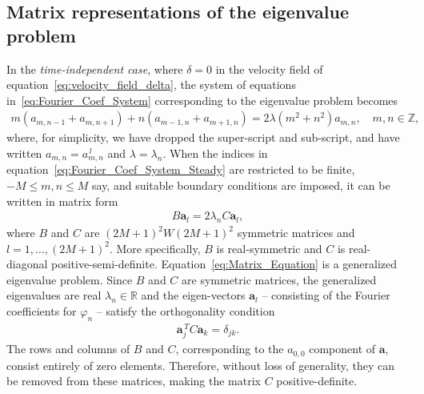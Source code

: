 \documentclass[leqno,onefignum,onetabnum]{siamltex1213}
\newcommand{\veca}{\boldsymbol{a}}
\begin{document}
\subsection{Matrix representations of the eigenvalue problem}
%
In the \emph{time-independent case}, where $\delta=0$ in the velocity field
of equation~\eqref{eq:velocity_field_delta}, the system of equations
in~\eqref{eq:Fourier_Coef_System} corresponding to the eigenvalue
problem 
becomes 
%
\begin{align}\label{eq:Fourier_Coef_System_Steady}
  m(a_{m,n-1}+a_{m,n+1})+n(a_{m-1,n}+a_{m+1,n})=2\lambda(m^2+n^2)a_{m,n},
  \quad m,n\in\mathbb{Z},
\end{align}
%
where, for simplicity, we have dropped the super-script and
sub-script, and have written $a_{m,n}=a^{\,l}_{m,n}$ and
$\lambda=\lambda_n$. When the indices in
equation~\eqref{eq:Fourier_Coef_System_Steady} are restricted to be
finite, 
$-M\leq m,n\leq M$ say, and suitable boundary conditions are imposed, it can
be written in matrix form   
%
\begin{align}\label{eq:Matrix_Equation}
  B\veca_l=2\lambda_n C\veca_l,
\end{align}
%
where $B$ and $C$ are $(2M+1)^2W(2M+1)^2$ symmetric matrices and
$l=1,\ldots,(2M+1)^2$. More specifically, $B$ is real-symmetric and $C$ is
real-diagonal
positive-semi-definite. Equation~\eqref{eq:Matrix_Equation} is a
generalized eigenvalue problem. Since 
$B$ and $C$ are symmetric matrices, the generalized eigenvalues are
real $\lambda_n\in\mathbb{R}$ and the eigen-vectors $\veca_l$ -- consisting
of the Fourier coefficients for $\varphi_n$ -- satisfy the orthogonality
condition 
%
\begin{align}\label{eq:Matrix_Ortho}
  \veca_j^{\,T}C\veca_k=\delta_{jk}.
\end{align}
%
The rows and columns of $B$ and $C$, corresponding to the $a_{0,0}$
component of $\veca$, consist entirely of zero elements. Therefore,
without loss of generality, they can be removed from these matrices,
making the matrix $C$ positive-definite. 
\end{document}
